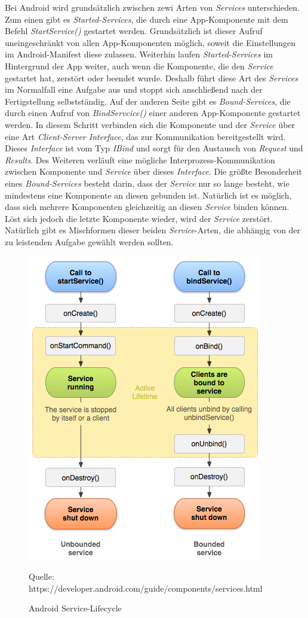 Bei Android wird grundsätzlich zwischen zewi Arten von \textit{Services} unterschieden. Zum einen gibt es \textit{Started-Services}, die durch eine App-Komponente mit dem Befehl \textit{StartService()} gestartet werden. Grundsätzlich ist dieser Aufruf uneingeschränkt von allen App-Komponenten möglich, soweit die Einstellungen im Android-Manifest diese zulassen. Weiterhin laufen \textit{Started-Services} im Hintergrund der App weiter, auch wenn die Komponente, die den \textit{Service} gestartet hat, zerstört oder beendet wurde. Deshalb führt diese Art des \textit{Services} im Normalfall eine Aufgabe aus und stoppt sich anschließend nach der Fertigstellung selbstständig. Auf der anderen Seite gibt es \textit{Bound-Services}, die durch einen Aufruf von \textit{BindServcice()} einer anderen App-Komponente gestartet werden. In diesem Schritt verbinden sich die Komponente und der \textit{Service} über eine Art \textit{Client-Server Interface}, das zur Kommunikation bereitgestellt wird. Dieses \textit{Interface} ist vom Typ \textit{IBind} und sorgt für den Austausch von \textit{Request} und \textit{Results}. Des Weiteren verläuft eine mögliche Interprozess-Kommunikation zwischen Komponente und \textit{Service} über dieses \textit{Interface}. Die größte Besonderheit eines \textit{Bound-Services} besteht darin, dass der \textit{Service} nur so lange besteht, wie mindestens eine Komponente an diesen gebunden ist. Natürlich ist es möglich, dass sich mehrere Komponenten gleichzeitig an diesen \textit{Service} binden können. Löst sich jedoch die letzte Komponente wieder, wird der \textit{Service} zerstört. Natürlich gibt es Mischformen dieser beiden \textit{Service}-Arten, die abhängig von der zu leistenden Aufgabe gewählt werden sollten. 
\begin{figure}[h]
\centering
\includegraphics[width=0.8\linewidth]{content/images/Android-ServiceLifecycle}
\caption{Android Service-Lifecycle}
Quelle: https://developer.android.com/guide/components/services.html
\label{pic:androidServiceLifecycle}
\end{figure}
